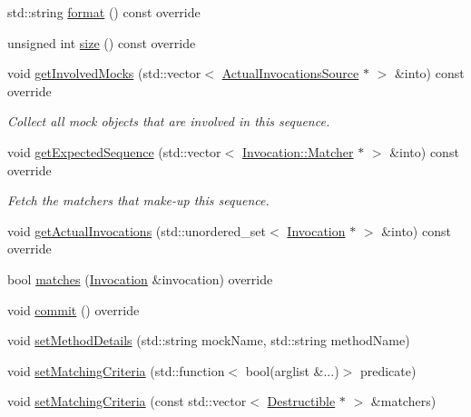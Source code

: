 \begin{DoxyCompactItemize}
\item 
std\+::string \mbox{\hyperlink{classfakeit_1_1MethodMockingContext_a0e71b77ab7f91d629a5853542d48624a}{format}} () const override
\item 
unsigned int \mbox{\hyperlink{classfakeit_1_1MethodMockingContext_a47e66f1a704bad7681f70a3e612d08a6}{size}} () const override
\item 
void \mbox{\hyperlink{classfakeit_1_1MethodMockingContext_ac66ba7b51a3c845b8fe8f2fa0f5f5ff0}{get\+Involved\+Mocks}} (std\+::vector$<$ \mbox{\hyperlink{structfakeit_1_1ActualInvocationsSource}{Actual\+Invocations\+Source}} $\ast$ $>$ \&into) const override
\begin{DoxyCompactList}\small\item\em Collect all mock objects that are involved in this sequence. \end{DoxyCompactList}\item 
void \mbox{\hyperlink{classfakeit_1_1MethodMockingContext_ab88d912b17801968fab8443079e2eabc}{get\+Expected\+Sequence}} (std\+::vector$<$ \mbox{\hyperlink{structfakeit_1_1Invocation_1_1Matcher}{Invocation\+::\+Matcher}} $\ast$ $>$ \&into) const override
\begin{DoxyCompactList}\small\item\em Fetch the matchers that make-\/up this sequence. \end{DoxyCompactList}\item 
void \mbox{\hyperlink{classfakeit_1_1MethodMockingContext_ad6803405abfd419799882f837d6f56b6}{get\+Actual\+Invocations}} (std\+::unordered\+\_\+set$<$ \mbox{\hyperlink{structfakeit_1_1Invocation}{Invocation}} $\ast$ $>$ \&into) const override
\item 
bool \mbox{\hyperlink{classfakeit_1_1MethodMockingContext_a240fe9e15cffcebd52f5b0c9ccf87654}{matches}} (\mbox{\hyperlink{structfakeit_1_1Invocation}{Invocation}} \&invocation) override
\item 
void \mbox{\hyperlink{classfakeit_1_1MethodMockingContext_a68a56b3fbd0a2b654a1c72de66e68a71}{commit}} () override
\item 
void \mbox{\hyperlink{classfakeit_1_1MethodMockingContext_a108167e6800e17c71ed5bbed5fcd955a}{set\+Method\+Details}} (std\+::string mock\+Name, std\+::string method\+Name)
\item 
void \mbox{\hyperlink{classfakeit_1_1MethodMockingContext_a43555a14b32453588eb3990a7c6b9a09}{set\+Matching\+Criteria}} (std\+::function$<$ bool(arglist \&...)$>$ predicate)
\item 
void \mbox{\hyperlink{classfakeit_1_1MethodMockingContext_affc5ac50fc419a5f8b5adff8d5d02941}{set\+Matching\+Criteria}} (const std\+::vector$<$ \mbox{\hyperlink{classfakeit_1_1Destructible}{Destructible}} $\ast$ $>$ \&matchers)

\end{DoxyCompactItemize}
